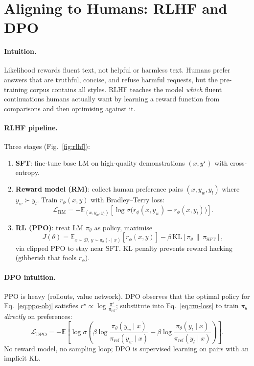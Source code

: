 \section{Aligning to Humans: RLHF and DPO}
\label{sec:rlhf}
\paragraph{Intuition.} Likelihood rewards fluent text, not helpful or harmless text. Humans prefer answers that are truthful, concise, and refuse harmful requests, but the pre-training corpus contains all styles. RLHF teaches the model \emph{which} fluent continuations humans actually want by learning a reward function from comparisons and then optimising against it.

\paragraph{RLHF pipeline.} Three stages (Fig.~\ref{fig:rlhf}):
\begin{enumerate}[label=\arabic*., leftmargin=1.4em, itemsep=0.2em, topsep=0.2em]
    \item \textbf{SFT}: fine-tune base LM on high-quality demonstrations $(x, y^\star)$ with cross-entropy.
    \item \textbf{Reward model (RM)}: collect human preference pairs $(x, y_w, y_l)$ where $y_w\succ y_l$. Train $r_\phi(x,y)$ with Bradley--Terry loss:
    \begin{equation}
    \mathcal{L}_{\text{RM}}=-\mathbb{E}_{(x,y_w,y_l)}\!\left[\log\sigma\!\big(r_\phi(x,y_w)-r_\phi(x,y_l)\big)\right].
    \label{eq:rm-loss}
    \end{equation}
    \item \textbf{RL (PPO)}: treat LM $\pi_\theta$ as policy, maximise
    \begin{equation}
    J(\theta)=\mathbb{E}_{x\sim\mathcal{D},\,y\sim\pi_\theta(\cdot\mid x)}\!\left[r_\phi(x,y)\right]-\beta\,\text{KL}\!\left[\pi_\theta\,\|\,\pi_{\text{SFT}}\right],
    \label{eq:ppo-obj}
    \end{equation}
    via clipped PPO to stay near SFT. KL penalty prevents reward hacking (gibberish that fools $r_\phi$).
\end{enumerate}

\paragraph{DPO intuition.} PPO is heavy (rollouts, value network). DPO observes that the optimal policy for Eq.~\eqref{eq:ppo-obj} satisfies $r^\star\propto\log\frac{\pi^\star}{\pi_{\text{ref}}}$; substitute into Eq.~\eqref{eq:rm-loss} to train $\pi_\theta$ \emph{directly} on preferences:
\begin{equation}
\mathcal{L}_{\text{DPO}}=-\mathbb{E}\!\left[\log\sigma\!\left(\beta\log\frac{\pi_\theta(y_w\mid x)}{\pi_{\text{ref}}(y_w\mid x)}-\beta\log\frac{\pi_\theta(y_l\mid x)}{\pi_{\text{ref}}(y_l\mid x)}\right)\right].
\end{equation}
No reward model, no sampling loop; DPO is supervised learning on pairs with an implicit KL.

